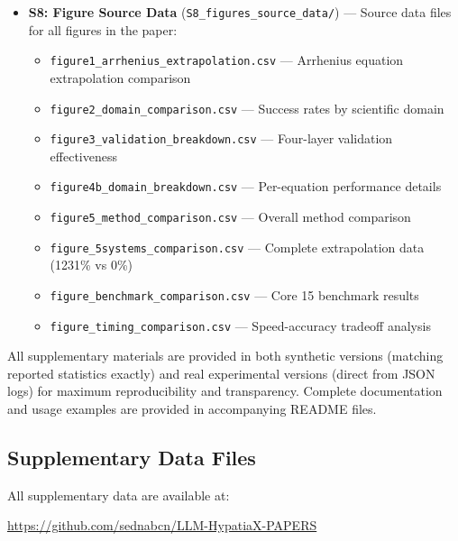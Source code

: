 \documentclass[twoside,11pt]{article}
\begin{document}
\begin{itemize}
\item \textbf{S8: Figure Source Data} (\texttt{S8\_figures\_source\_data/}) --- Source data files for all figures in the paper:
\begin{itemize}
\item \texttt{figure1\_arrhenius\_extrapolation.csv} --- Arrhenius equation extrapolation comparison
\item \texttt{figure2\_domain\_comparison.csv} --- Success rates by scientific domain
\item \texttt{figure3\_validation\_breakdown.csv} --- Four-layer validation effectiveness
\item \texttt{figure4b\_domain\_breakdown.csv} --- Per-equation performance details
\item \texttt{figure5\_method\_comparison.csv} --- Overall method comparison
\item \texttt{figure\_5systems\_comparison.csv} --- Complete extrapolation data (1231\% vs 0\%)
\item \texttt{figure\_benchmark\_comparison.csv} --- Core 15 benchmark results
\item \texttt{figure\_timing\_comparison.csv} --- Speed-accuracy tradeoff analysis
\end{itemize}
\end{itemize}

All supplementary materials are provided in both synthetic versions (matching reported statistics exactly) and real experimental versions (direct from JSON logs) for maximum reproducibility and transparency. Complete documentation and usage examples are provided in accompanying README files.

\subsection{Supplementary Data Files}

All supplementary data are available at:
\begin{center}
{\small\url{https://github.com/sednabcn/LLM-HypatiaX-PAPERS}}
\end{center}
\end{document}
